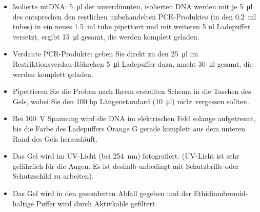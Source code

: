\documentclass[a4paper,english]{scrreprt}
\begin{document}
\begin{itemize}
	\item Isolierte mtDNA: \SI{5}{\ul} der unverdünnten, isolierten DNA
		werden mit je \SI{5}{\ul} des entsprechen den restlichen
		unbehandelten PCR-Produktes (in den \SI{0.2}{\ml} tubes) in ein
		neues \SI{1.5}{\ml} tube pipettiert und mit weiteren 5 ul
		Ladepuffer versetzt, ergibt \SI{15}{\ul} gesamt, die werden
		komplett geladen.
	\item Verdaute PCR-Produkte: geben Sie direkt zu den \SI{25}{\ul} im
		Restriktionsverdau-Röhrchen \SI{5}{\ul} Ladepuffer dazu, macht
		\SI{30}{\ul} gesamt, die werden komplett geladen.
	\item Pipettieren Sie die Proben nach Ihrem erstellten Schema in die
		Taschen des Gels, wobei Sie den 100 bp Längenstandard
		(\SI{10}{\ul}) nicht vergessen sollten.
	\item Bei \SI{100}{\V} Spannung wird die DNA im elektrischen Feld
		solange aufgetrennt, bis die Farbe des Ladepuffers Orange G
		gerade komplett aus dem unteren Rand des Gels herausläuft.
	\item Das Gel wird im UV-Licht (bei \SI{254}{\nm}) fotografiert.
		(UV-Licht ist sehr gefährlich für die Augen. Es ist deshalb
		unbedingt mit Schutzbrille oder Schutzschild zu arbeiten).
	\item Das Gel wird in den gesonderten Abfall gegeben und der
		Ethidiumbromid-haltige Puffer wird durch Aktivkohle gefiltert.
\end{itemize}
\end{document}
